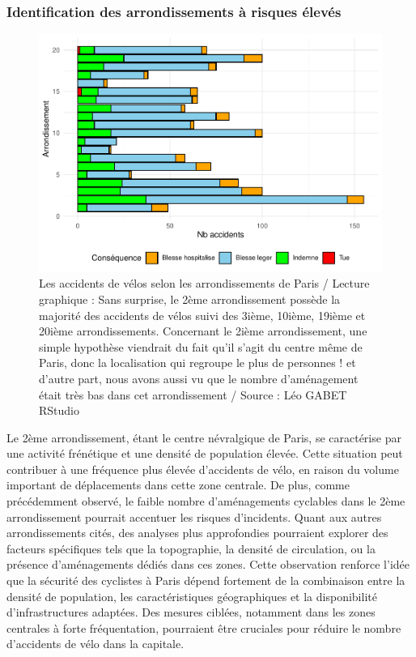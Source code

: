 \documentclass[french,]{compterendu}
\theoremstyle{urcastyle}
\theoremstyle{remark}
\begin{document}
\hypertarget{identification-des-arrondissements-uxe0-risques-uxe9levuxe9s}{%
\subsubsection{Identification des arrondissements à risques élevés}\label{identification-des-arrondissements-uxe0-risques-uxe9levuxe9s}}

\begin{figure}[H]

{\centering \includegraphics[width=0.9\linewidth]{Rapport_ADD_LEO-GABET_files/figure-latex/arrPARISaccident-1} 

}

\caption{Les accidents de vélos selon les arrondissements de Paris / Lecture graphique : Sans surprise, le 2ème arrondissement possède la majorité des accidents de vélos suivi des 3ième, 10ième, 19ième et 20ième arrondissements. Concernant le 2ième arrondissement, une simple hypothèse viendrait du fait qu'il s'agit du centre même de Paris, donc la localisation qui regroupe le plus de personnes ! et d'autre part, nous avons aussi vu que le nombre d'aménagement était très bas dans cet arrondissement / Source : Léo GABET RStudio}\label{fig:arrPARISaccident}
\end{figure}

Le 2ème arrondissement, étant le centre névralgique de Paris, se caractérise par une activité frénétique et une densité de population élevée. Cette situation peut contribuer à une fréquence plus élevée d'accidents de vélo, en raison du volume important de déplacements dans cette zone centrale. De plus, comme précédemment observé, le faible nombre d'aménagements cyclables dans le 2ème arrondissement pourrait accentuer les risques d'incidents.
Quant aux autres arrondissements cités, des analyses plus approfondies pourraient explorer des facteurs spécifiques tels que la topographie, la densité de circulation, ou la présence d'aménagements dédiés dans ces zones.
Cette observation renforce l'idée que la sécurité des cyclistes à Paris dépend fortement de la combinaison entre la densité de population, les caractéristiques géographiques et la disponibilité d'infrastructures adaptées. Des mesures ciblées, notamment dans les zones centrales à forte fréquentation, pourraient être cruciales pour réduire le nombre d'accidents de vélo dans la capitale.
\end{document}

